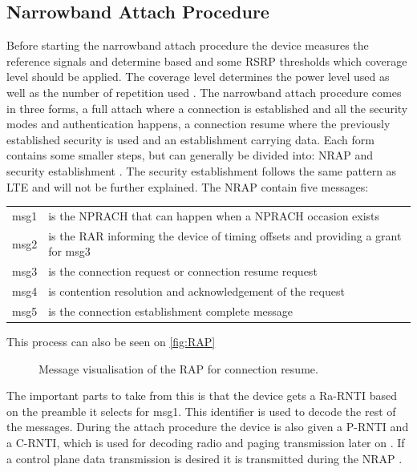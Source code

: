 \subsection{Narrowband Attach Procedure} \label{sec:RAP}
Before starting the narrowband attach procedure the device measures the reference signals and determine based and some \gls{RSRP} thresholds which coverage level should be applied. The coverage level determines the power level used as well as the number of repetition used \citep{NB-IoT_Book}. The narrowband attach procedure comes in three forms, a full attach where a connection is established and all the security modes and authentication happens, a connection resume where the previously established security is used and an establishment carrying data. Each form contains some smaller steps, but can generally be divided into: \gls{NRAP} and security establishment \citep{REL-13}. The security establishment follows the same pattern as LTE and will not be further explained. The \gls{NRAP} contain five messages:
\begin{tabular}{ll}
msg1 & is the NPRACH that can happen when a NPRACH occasion exists \\
msg2 & is the \gls{RAR} informing the device of timing offsets and providing a grant for msg3 \\
msg3 & is the connection request or connection resume request \\
msg4 & is contention resolution and acknowledgement of the request \\
msg5 & is the connection establishment complete message\\
\end{tabular}

This process can also be seen on \autoref{fig:RAP}


\begin{figure}[H]
\centering

\caption{Message visualisation of the \gls{RAP} for connection resume.}
\label{fig:RAP}
\end{figure}

The important parts to take from this is that the device gets a \gls{Ra-RNTI} based on the preamble it selects for msg1. This identifier is used to decode the rest of the messages. During the attach procedure the device is also given a \gls{P-RNTI} and a \gls{C-RNTI}, which is used for decoding radio and paging transmission later on \citep{whitepaper}. If a control plane data transmission is desired it is transmitted during the \gls{NRAP} \citep{primer}.


